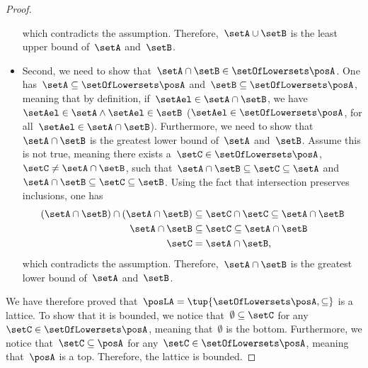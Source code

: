 \begin{proof}
\begin{itemize}
\begin{equation}
              \end{equation}
              which contradicts the assumption.
              Therefore,~$\setA\cup \setB$ is the least upper bound of~$\setA$ and~$\setB$.
        \item Second, we need to show that~$\setA\cap \setB\in \setOfLowersets \posA$.
              One has~$\setA\subseteq \setOfLowersets \posA$ and~$\setB\subseteq \setOfLowersets \posA$, meaning that by definition, if~$\setAel\in \setA\cap \setB$, we have~$\setAel \in \setA\wedge \setAel\in \setB$ ($\setAel\in \setOfLowersets \posA$, for all~$\setAel\in \setA\cap \setB$).
              Furthermore, we need to show that~$\setA\cap \setB$ is the greatest lower bound of~$\setA$ and~$\setB$.
              Assume this is not true, meaning there exists a~$\setC\in \setOfLowersets \posA$,~$\setC\neq \setA\cap \setB$, such that~$\setA\cap \setB\subseteq \setC\subseteq \setA$ and~$\setA\cap \setB\subseteq \setC\subseteq \setB$.
              Using the fact that intersection preserves inclusions, one has
              \begin{equation}
                  \begin{aligned}
                      (\setA\cap \setB)
                      \cap (\setA\cap \setB) & \subseteq \setC \cap \setC \subseteq \setA\cap \setB \\
                      \setA\cap \setB        & \subseteq \setC\subseteq \setA\cap \setB             \\
                      \setC                  & =\setA\cap \setB,
                  \end{aligned}
              \end{equation}
              which contradicts the assumption.
              Therefore,~$\setA\cap \setB$ is the greatest lower bound of~$\setA$ and~$\setB$.
    \end{itemize}
    We have therefore proved that~$\posLA=\tup{\setOfLowersets \posA,\subseteq}$ is a lattice.
    To show that it is bounded, we notice that~$\emptyset \subseteq \setC$ for any~$\setC\in \setOfLowersets \posA$, meaning that~$\emptyset$ is the bottom.
    Furthermore, we notice that~$\setC\subseteq \posA$ for any~$\setC\in \setOfLowersets \posA$, meaning that~$\posA$ is a top.
    Therefore, the lattice is bounded.
\end{proof}
